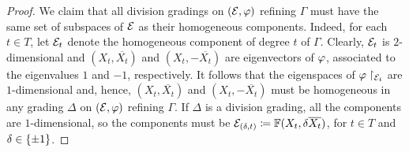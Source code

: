 \begin{proof}
    We claim that all division gradings on $(\mathcal E, \varphi)$ refining $\Gamma$ must have the same set of subspaces of $\mathcal E$ as their homogeneous components. 
    Indeed, for each $t\in T$, let $\mathcal E_t$ denote the homogeneous component of degree $t$ of $\Gamma$. 
    Clearly, $\mathcal E_t$ is $2$-dimensional and $(X_t, \overline{X_t})$ and $(X_t, -\overline{X_t})$ are eigenvectors of $\varphi$, associated to the eigenvalues $1$ and $-1$, respectively. 
    It follows that the eigenspaces of $\varphi \restriction_{\mathcal E_t}$ are $1$-dimensional and, hence, $(X_t, \overline{X_t})$ and $(X_t, -\overline{X_t})$ must be homogeneous in any grading $\Delta$ on $(\mathcal E, \varphi)$ refining $\Gamma$. 
    If $\Delta$ is a division grading, all the components are $1$-dimensional, so the components must be $\mathcal E_{(\delta, t)} \coloneqq \mathbb{F} (X_t, \delta \overline{X_t})$, for $t\in T$ and $\delta \in \{ \pm 1 \}$.
    
    
    

\end{proof}
